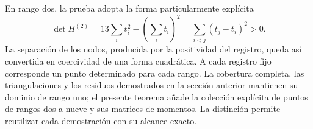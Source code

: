 En rango dos, la prueba adopta la forma particularmente explícita
\[
 \det H^{(2)}=13\sum_i t_i^2-\left(\sum_i t_i\right)^2
 =\sum_{i<j}(t_j-t_i)^2>0.
\]
La separación de los nodos, producida por la positividad del registro,
queda así convertida en coercividad de una forma cuadrática. A cada
registro fijo corresponde un punto determinado para cada rango. La
cobertura completa, las triangulaciones y los residuos demostrados en la
sección anterior mantienen su dominio de rango uno; el presente teorema
añade la colección explícita de puntos de rangos dos a nueve y sus matrices
de momentos. La distinción permite reutilizar cada demostración con su
alcance exacto.
